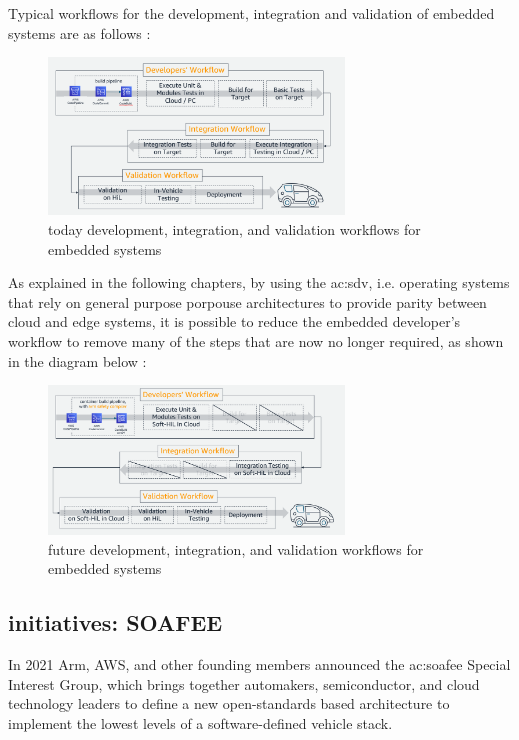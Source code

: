 Typical workflows for the development, integration and validation of embedded systems are as follows \cite{DevelopersWorkflow}:
\begin{figure}[h]  %
    \centering
    \includegraphics[width=0.7\textwidth]{images/today_developer_workflow.png}  %
    \caption{today development, integration, and validation workflows for embedded systems}
    \label{fig:TodayDeveloperWorkflow}
\end{figure}

As explained in the following chapters, by using the \gls{ac:sdv}, i.e. operating systems that rely on general purpose porpouse architectures to provide parity between cloud and edge systems, it is possible to reduce the embedded developer's workflow to remove many of the steps that are now no longer required, as shown in the diagram below \cite{DevelopersWorkflow}:
\begin{figure}[h]  %
    \centering
    \includegraphics[width=0.7\textwidth]{images/future_developers_workflow.png}  %
    \caption{future development, integration, and validation workflows for embedded systems}
    \label{fig:FutureDevelopersWorkflow}
\end{figure}

\subsection{initiatives: SOAFEE}
In 2021 Arm, AWS, and other founding members announced the \gls{ac:soafee} Special Interest Group, which brings together automakers, semiconductor, and cloud technology leaders to define a new open-standards based architecture to implement the lowest levels of a software-defined vehicle stack. \cite{DevelopersWorkflow}

